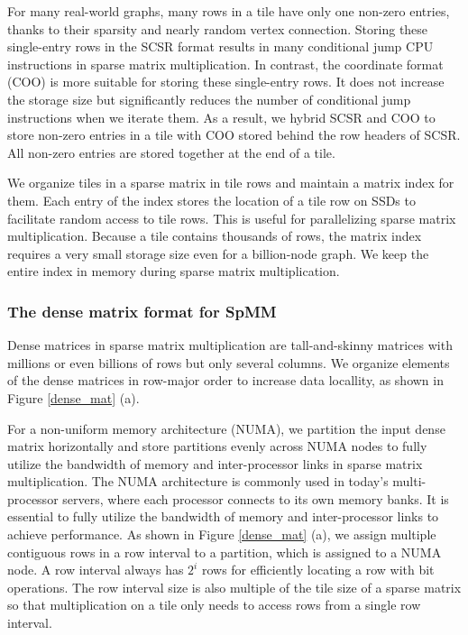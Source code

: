 For many real-world graphs, many rows in a tile have only one non-zero entries,
thanks to their sparsity and nearly random vertex connection. Storing these
single-entry rows in the SCSR format results in many conditional jump CPU
instructions in sparse matrix multiplication.
In contrast, the coordinate format (COO) is more suitable for storing these
single-entry rows. It does not increase the storage size but significantly
reduces the number of conditional jump instructions when we iterate
them. As a result, we hybrid SCSR and COO to store non-zero entries in a tile
with COO stored behind the row headers of SCSR. All non-zero entries are
stored together at the end of a tile.

We organize tiles in a sparse matrix in tile rows and maintain a matrix index
for them. Each entry of the index stores the location of a tile row on SSDs
to facilitate random access
to tile rows. This is useful for parallelizing sparse matrix multiplication.
Because a tile contains thousands of rows, the matrix index requires a very
small storage size even for a billion-node graph. We keep the entire index
in memory during sparse matrix multiplication.

\subsubsection{The dense matrix format for SpMM} \label{numa_mat}
Dense matrices in sparse matrix multiplication are tall-and-skinny matrices
with millions or even billions of rows but only several columns. We organize
elements of the dense matrices in row-major order to increase data locallity,
as shown in Figure \ref{dense_mat} (a).

For a non-uniform memory architecture (NUMA), we partition the input dense matrix
horizontally and store partitions evenly across NUMA nodes to fully utilize
the bandwidth of memory and inter-processor links in sparse matrix
multiplication. The NUMA architecture is commonly used in today's multi-processor
servers, where each processor connects to its own memory banks. It is essential
to fully utilize the bandwidth of memory and inter-processor links to achieve
performance. As shown in Figure \ref{dense_mat} (a), we assign multiple
contiguous rows in a row interval to a partition, which is assigned to a NUMA
node. A row interval always has $2^i$ rows for efficiently locating a row
with bit operations. The row interval size is also multiple of the tile size of
a sparse matrix so that multiplication on a tile only needs to access rows
from a single row interval.

